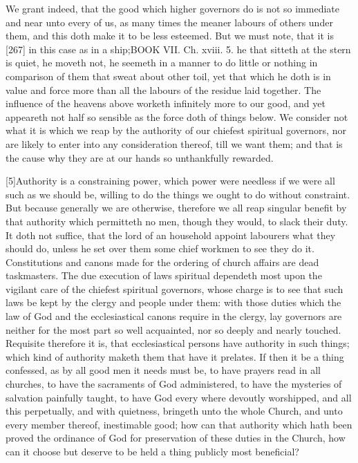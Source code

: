 We grant indeed, that the good which higher governors do is not so immediate and near unto every of us, as many times the meaner labours of others under them, and this doth make it to be less esteemed. But we must note, that it is [267] in this case as in a ship;BOOK VII. Ch. xviii. 5. he that sitteth at the stern is quiet, he moveth not, he seemeth in a manner to do little or nothing in comparison of them that sweat about other toil, yet that which he doth is in value and force more than all the labours of the residue laid together. The influence of the heavens above worketh infinitely more to our good, and yet appeareth not half so sensible as the force doth of things below. We consider not what it is which we reap by the authority of our chiefest spiritual governors, nor are likely to enter into any consideration thereof, till we want them; and that is the cause why they are at our hands so unthankfully rewarded.

[5]Authority is a constraining power, which power were needless if we were all such as we should be, willing to do the things we ought to do without constraint. But because generally we are otherwise, therefore we all reap singular benefit by that authority which permitteth no men, though they would, to slack their duty. It doth not suffice, that the lord of an household appoint labourers what they should do, unless he set over them some chief workmen to see they do it. Constitutions and canons made for the ordering of church affairs are dead taskmasters. The due execution of laws spiritual dependeth most upon the vigilant care of the chiefest spiritual governors, whose charge is to see that such laws be kept by the clergy and people under them: with those duties which the law of God and the ecclesiastical canons require in the clergy, lay governors are neither for the most part so well acquainted, nor so deeply and nearly touched. Requisite therefore it is, that ecclesiastical persons have authority in such things; which kind of authority maketh them that have it prelates. If then it be a thing confessed, as by all good men it needs must be, to have prayers read in all churches, to have the sacraments of God administered, to have the mysteries of salvation painfully taught, to have God every where devoutly worshipped, and all this perpetually, and with quietness, bringeth unto the whole Church, and unto every member thereof, inestimable good; how can that authority which hath been proved the ordinance of God for preservation of these duties in the Church, how can it choose but deserve to be held a thing publicly most beneficial?

